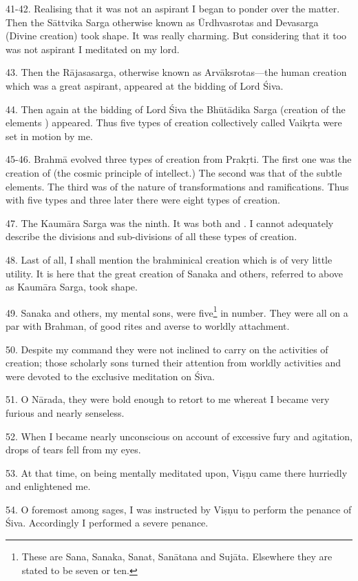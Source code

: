 41-42. Realising that it was not an aspirant I began to ponder over the matter.
Then the Sāttvika Sarga otherwise known as Ūrdhvasrotas and Devasarga (Divine
creation) took shape. It was really charming. But considering that it too was
not aspirant I meditated on my lord.

43. Then the Rājasasarga, otherwise known as Arvāksrotas—the human creation
which was a great aspirant, appeared at the bidding of Lord Śiva.

44. Then again at the bidding of Lord Śiva the Bhūtādika Sarga (creation of
the elements \etc) appeared. Thus five types of creation collectively called
Vaikṛta were set in motion by me.

45-46. Brahmā evolved three types of creation from Prakṛti. The first one was
the creation of  (the cosmic principle of intellect.) The second was
that of the subtle elements. The third was  of the nature of
transformations and ramifications. Thus with five  types and three
later  there were eight types of creation.

47. The Kaumāra Sarga was the ninth. It was both  and .
I cannot adequately describe the divisions and sub-divisions of all these types
of creation.

48. Last of all, I shall mention the brahminical creation which is of very
little utility. It is here that the great creation of Sanaka and others,
referred to above as Kaumāra Sarga, took shape.

49. Sanaka and others, my mental sons, were five\footnote{These are Sana, Sanaka,
Sanat, Sanātana and Sujāta. Elsewhere they are stated to be seven or ten.} in
number. They were all on a par with Brahman, of good rites and averse to worldly
attachment.

50. Despite my command they were not inclined to carry on the activities of
creation; those scholarly sons turned their attention from worldly activities
and were devoted to the exclusive meditation on Śiva.

51. O Nārada, they were bold enough to retort to me whereat I became very
furious and nearly senseless.

52. When I became nearly unconscious on account of excessive fury and agitation,
drops of tears fell from my eyes.

53. At that time, on being mentally meditated upon, Viṣṇu came there hurriedly
and enlightened me.

54. O foremost among sages, I was instructed by Viṣṇu to perform the penance of
Śiva. Accordingly I performed a severe penance.

